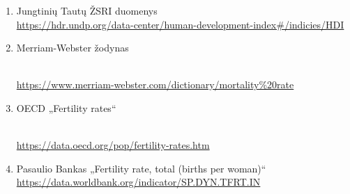 \begin{enumerate}
    \item Jungtinių Tautų ŽSRI duomenys \\
    \href{https://hdr.undp.org/data-center/human-development-index\#/indicies/HDI}{https://hdr.undp.org/data-center/human-development-index\#/indicies/HDI}
    \item \hypertarget{merriam}{Merriam-Webster žodynas} \\
    \href{https://www.merriam-webster.com/dictionary/mortality\%20rate}{https://www.merriam-webster.com/dictionary/mortality\%20rate}
    \item \hypertarget{oecd}{OECD „Fertility rates“} \\
    \href{https://data.oecd.org/pop/fertility-rates.htm}{https://data.oecd.org/pop/fertility-rates.htm}
    \item Pasaulio Bankas „Fertility rate, total (births per woman)“ \\
    \href{https://data.worldbank.org/indicator/SP.DYN.TFRT.IN}{https://data.worldbank.org/indicator/SP.DYN.TFRT.IN}
\end{enumerate}

